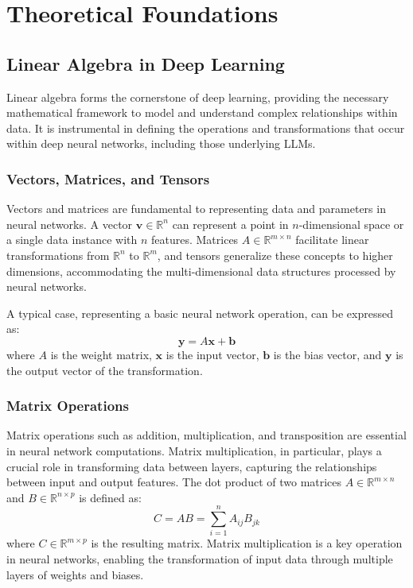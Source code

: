 \chapter{Theoretical Foundations}

\section{Linear Algebra in Deep Learning}
Linear algebra forms the cornerstone of deep learning, providing the necessary mathematical framework to model and understand complex relationships within data. It is instrumental in defining the operations and transformations that occur within deep neural networks, including those underlying LLMs.

\subsection{Vectors, Matrices, and Tensors}
Vectors and matrices are fundamental to representing data and parameters in neural networks. A vector $\mathbf{v} \in \mathbb{R}^n$ can represent a point in $n$-dimensional space or a single data instance with $n$ features. Matrices $A \in \mathbb{R}^{m \times n}$ facilitate linear transformations from $\mathbb{R}^n$ to $\mathbb{R}^m$, and tensors generalize these concepts to higher dimensions, accommodating the multi-dimensional data structures processed by neural networks.

A typical case, representing a basic neural network operation, can be expressed as:
\begin{equation}
    \mathbf{y} = A\mathbf{x} + \mathbf{b}
    \label{eq:matrix_multiplication}
\end{equation}
where $A$ is the weight matrix, $\mathbf{x}$ is the input vector, $\mathbf{b}$ is the bias vector, and $\mathbf{y}$ is the output vector of the transformation.

\subsection{Matrix Operations}
    Matrix operations such as addition, multiplication, and transposition are essential in neural network computations. Matrix multiplication, in particular, plays a crucial role in transforming data between layers, capturing the relationships between input and output features. The dot product of two matrices $A \in \mathbb{R}^{m \times n}$ and $B \in \mathbb{R}^{n \times p}$ is defined as:
    \begin{equation}
        C = AB = \sum_{i=1}^{n} A_{ij}B_{jk}
        \label{eq:matrix_multiplication}
    \end{equation}
    where $C \in \mathbb{R}^{m \times p}$ is the resulting matrix. Matrix multiplication is a key operation in neural networks, enabling the transformation of input data through multiple layers of weights and biases.
    
